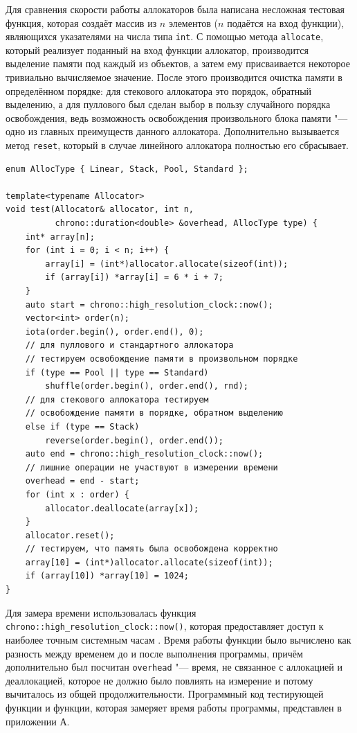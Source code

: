 Для сравнения скорости работы аллокаторов была написана несложная тестовая функция, которая создаёт массив из $n$ элементов ($n$ подаётся на вход функции), являющихся указателями на числа типа \texttt{int}. С помощью метода \texttt{allocate}, который реализует поданный на вход функции аллокатор, производится выделение памяти под каждый из объектов, а затем ему присваивается некоторое тривиально вычисляемое значение. После этого производится очистка памяти в определённом порядке: для стекового аллокатора это порядок, обратный выделению, а для пуллового был сделан выбор в пользу случайного порядка освобождения, ведь возможность освобождения произвольного блока памяти "--- одно из главных преимуществ данного аллокатора. Дополнительно вызывается метод \texttt{reset}, который в случае линейного аллокатора полностью его сбрасывает.

\small
\begin{verbatim}
enum AllocType { Linear, Stack, Pool, Standard };

template<typename Allocator>
void test(Allocator& allocator, int n,
		  chrono::duration<double> &overhead, AllocType type) {
    int* array[n];
    for (int i = 0; i < n; i++) {
        array[i] = (int*)allocator.allocate(sizeof(int));
        if (array[i]) *array[i] = 6 * i + 7;
    }
	auto start = chrono::high_resolution_clock::now();
  	vector<int> order(n);
	iota(order.begin(), order.end(), 0);
	// для пуллового и стандартного аллокатора
	// тестируем освобождение памяти в произвольном порядке
	if (type == Pool || type == Standard)
		shuffle(order.begin(), order.end(), rnd);
	// для стекового аллокатора тестируем
	// освобождение памяти в порядке, обратном выделению
	else if (type == Stack)
		reverse(order.begin(), order.end()); 
	auto end = chrono::high_resolution_clock::now();
	// лишние операции не участвуют в измерении времени
	overhead = end - start;
	for (int x : order) {
		allocator.deallocate(array[x]);
	}
	allocator.reset();
	// тестируем, что память была освобождена корректно
	array[10] = (int*)allocator.allocate(sizeof(int));
	if (array[10]) *array[10] = 1024;
}
\end{verbatim}
\normalsize

Для замера времени использовалась функция \texttt{chrono::high\_resolution\_clock::now()}, которая предоставляет доступ к наиболее точным системным часам \cite{cpp-reference}. Время работы функции было вычислено как разность между временем до и после выполнения программы, причём дополнительно был посчитан \texttt{overhead} "--- время, не связанное с аллокацией и деаллокацией, которое не должно было повлиять на измерение и потому вычиталось из общей продолжительности. Программный код тестирующей функции и функции, которая замеряет время работы программы, представлен в приложении А.

